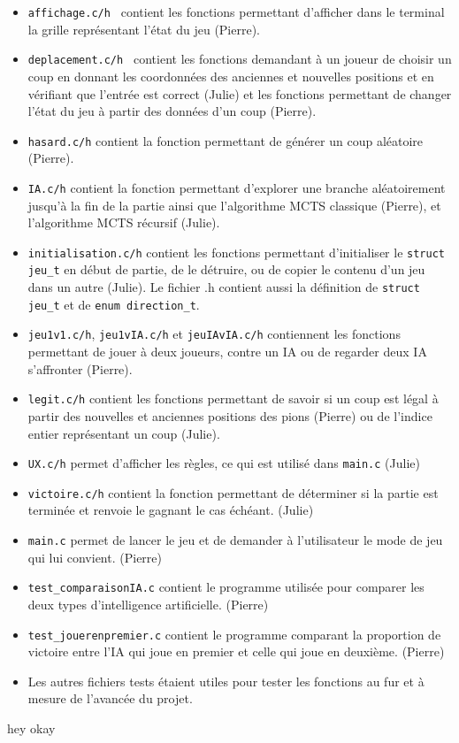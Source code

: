 \documentclass{article}
\begin{document}
\begin{itemize}
    \item {\tt affichage.c/h } contient les fonctions permettant d'afficher dans le terminal la grille représentant l'état du jeu (Pierre).
    \item {\tt deplacement.c/h } contient les fonctions demandant à un joueur de choisir un coup en donnant les coordonnées des anciennes et nouvelles positions et en vérifiant que l'entrée est correct (Julie) et les fonctions permettant de changer l'état du jeu à partir des données d'un coup (Pierre).
    \item {\tt hasard.c/h} contient la fonction permettant de générer un coup aléatoire (Pierre).
    \item {\tt IA.c/h} contient la fonction permettant d'explorer une branche aléatoirement jusqu'à la fin de la partie ainsi que l'algorithme MCTS classique (Pierre), et l'algorithme MCTS récursif (Julie).
    \item {\tt initialisation.c/h} contient les fonctions permettant d'initialiser le {\tt struct jeu\_t} en début de partie, de le détruire, ou de copier le contenu d'un jeu dans un autre (Julie). Le fichier .h contient aussi la définition de {\tt struct jeu\_t} et de {\tt enum direction\_t}.
    \item {\tt jeu1v1.c/h}, {\tt jeu1vIA.c/h} et {\tt jeuIAvIA.c/h} contiennent les fonctions permettant de jouer à deux joueurs, contre un IA ou de regarder deux IA s'affronter (Pierre).
    \item {\tt legit.c/h} contient les fonctions permettant de savoir si un coup est légal à partir des nouvelles et anciennes positions des pions (Pierre) ou de l'indice entier représentant un coup (Julie).
    \item {\tt UX.c/h} permet d'afficher les règles, ce qui est utilisé dans {\tt main.c} (Julie)
    \item {\tt victoire.c/h} contient la fonction permettant de déterminer si la partie est terminée et renvoie le gagnant le cas échéant. (Julie)

    \item {\tt main.c} permet de lancer le jeu et de demander à l'utilisateur le mode de jeu qui lui convient. (Pierre)
    \item {\tt test\_comparaisonIA.c} contient le programme utilisée pour comparer les deux types d'intelligence artificielle. (Pierre)
    \item {\tt test\_jouerenpremier.c} contient le programme comparant la proportion de victoire entre l'IA qui joue en premier et celle qui joue en deuxième. (Pierre)
    \item Les autres fichiers tests étaient utiles pour tester les fonctions au fur et à mesure de l'avancée du projet.
\end{itemize}


hey okay
\end{document}

